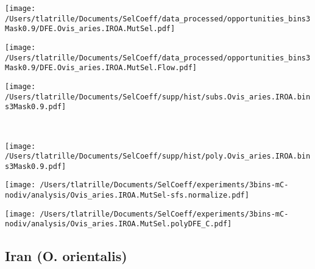 \documentclass{article}
\begin{document}
    \begin{minipage}{0.32\linewidth}
        \texttt{[image: /Users/tlatrille/Documents/SelCoeff/data\_processed/opportunities\_bins3Mask0.9/DFE.Ovis\_aries.IROA.MutSel.pdf]}
    \end{minipage}
    \begin{minipage}{0.32\linewidth}
        \texttt{[image: /Users/tlatrille/Documents/SelCoeff/data\_processed/opportunities\_bins3Mask0.9/DFE.Ovis\_aries.IROA.MutSel.Flow.pdf]}
    \end{minipage}
    \begin{minipage}{0.32\linewidth}
        \texttt{[image: /Users/tlatrille/Documents/SelCoeff/supp/hist/subs.Ovis\_aries.IROA.bins3Mask0.9.pdf]}
    \end{minipage}
    \\
    \begin{minipage}{0.32\linewidth}
        \texttt{[image: /Users/tlatrille/Documents/SelCoeff/supp/hist/poly.Ovis\_aries.IROA.bins3Mask0.9.pdf]}
    \end{minipage}
    \begin{minipage}{0.32\linewidth}
        \texttt{[image: /Users/tlatrille/Documents/SelCoeff/experiments/3bins-mC-nodiv/analysis/Ovis\_aries.IROA.MutSel-sfs.normalize.pdf]}
    \end{minipage}
    \begin{minipage}{0.32\linewidth}
        \texttt{[image: /Users/tlatrille/Documents/SelCoeff/experiments/3bins-mC-nodiv/analysis/Ovis\_aries.IROA.MutSel.polyDFE\_C.pdf]}
    \end{minipage}
    \subsection{Iran (O. orientalis)}
\end{document}
